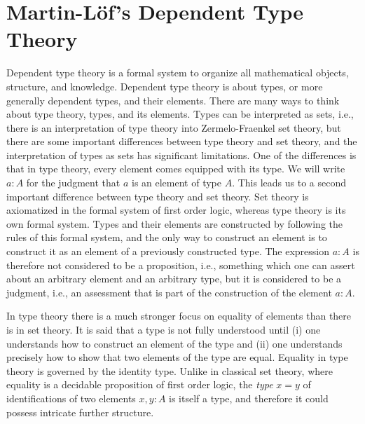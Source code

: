 \chapter{Martin-L\"of's Dependent Type Theory}
\label{chap:type-theory}%

Dependent type theory is a formal system to organize all mathematical objects, structure, and knowledge. Dependent type theory is about types, or more generally dependent types, and their elements. There are many ways to think about type theory, types, and its elements. Types can be interpreted as sets, i.e., there is an interpretation of type theory into Zermelo-Fraenkel set theory, but there are some important differences between type theory and set theory, and the interpretation of types as sets has significant limitations. One of the differences is that in type theory, every element comes equipped with its type. We will write $a:A$ for the judgment that $a$ is an element of type $A$. This leads us to a second important difference between type theory and set theory. Set theory is axiomatized in the formal system of first order logic, whereas type theory is its own formal system. Types and their elements are constructed by following the rules of this formal system, and the only way to construct an element is to construct it as an element of a previously constructed type. The expression $a:A$ is therefore not considered to be a proposition, i.e., something which one can assert about an arbitrary element and an arbitrary type, but it is considered to be a judgment, i.e., an assessment that is part of the construction of the element $a:A$.

In type theory there is a much stronger focus on equality of elements than there is in set theory. It is said that a type is not fully understood until (i) one understands how to construct an element of the type and (ii) one understands precisely how to show that two elements of the type are equal. Equality in type theory is governed by the identity type. Unlike in classical set theory, where equality is a decidable proposition of first order logic, the \emph{type} $x=y$ of identifications of two elements $x,y:A$ is itself a type, and therefore it could possess intricate further structure. 

